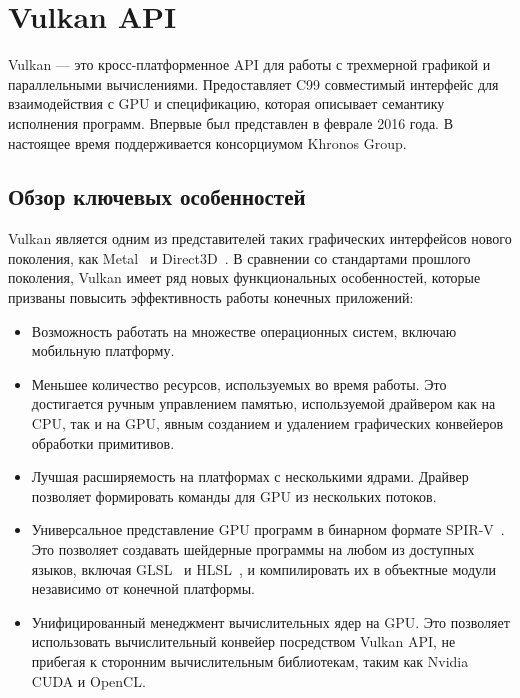 \documentclass[14pt]{matmex-diploma}
\begin{document}

\section{Vulkan API}

Vulkan --- это кросс-платформенное API для работы с трехмерной графикой и параллельными вычислениями. Предоставляет C99 совместимый интерфейс для взаимодействия с GPU и спецификацию, которая описывает семантику исполнения программ. Впервые был представлен в феврале 2016 года. В настоящее время поддерживается консорциумом Khronos Group. 

\subsection{Обзор ключевых особенностей}

Vulkan является одним из представителей таких графических интерфейсов нового поколения, как Metal~\cite{spec:metal} и Direct3D~\cite{spec:direct3d}. В сравнении со стандартами прошлого поколения, Vulkan имеет ряд новых функциональных особенностей, которые призваны повысить эффективность работы конечных приложений:

\begin{itemize}
    \item Возможность работать на множестве операционных систем, включаю мобильную платформу.
    \item Меньшее количество ресурсов, используемых во время работы. Это достигается ручным управлением памятью, используемой драйвером как на CPU, так и на GPU, явным созданием и удалением графических конвейеров обработки примитивов.
    \item Лучшая расширяемость на платформах с несколькими ядрами. Драйвер позволяет формировать команды для GPU из нескольких потоков. 
    \item Универсальное представление GPU программ в бинарном формате SPIR-V~\cite{spec:spirv}. Это позволяет создавать шейдерные программы на любом из доступных языков, включая GLSL~\cite{spec:glsl} и HLSL~\cite{spec:hlsl}, и компилировать их в объектные модули независимо от конечной платформы. 
    \item Унифицированный менеджмент вычислительных ядер на GPU. Это позволяет использовать вычислительный конвейер посредством Vulkan API, не прибегая к сторонним вычислительным библиотекам, таким как Nvidia CUDA и OpenCL.
\end{itemize}
\end{document}
